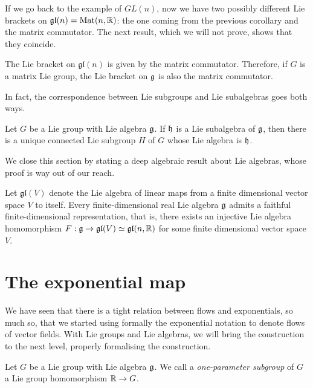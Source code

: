 If we go back to the example of $GL(n)$, now we have two possibly different Lie brackets on $\mathfrak{gl}(n)=\mathrm{Mat}(n, \mathbb{R})$: the one coming from the previous corollary and the matrix commutator.
The next result, which we will not prove, shows that they coincide.

\begin{proposition}
	The Lie bracket on $\mathfrak{gl}(n)$ is given by the matrix commutator.
	Therefore, if $G$ is a matrix Lie group, the Lie bracket on $\mathfrak{g}$ is also the matrix commutator.
\end{proposition}

In fact, the correspondence between Lie subgroups and Lie subalgebras goes both ways.

\begin{theorem}
	Let $G$ be a Lie group with Lie algebra $\mathfrak{g}$. If $\mathfrak{h}$ is a Lie subalgebra of $\mathfrak{g}$, then there is a unique connected Lie subgroup $H$ of $G$ whose Lie algebra is $\mathfrak{h}$.
\end{theorem}

We close this section by stating a deep algebraic result about Lie algebras, whose proof is way out of our reach.
\begin{theorem}
	Let $\mathfrak{gl}(V)$ denote the Lie algebra of linear maps from a finite dimensional vector space $V$ to itself.
	Every finite-dimensional real Lie algebra $\mathfrak{g}$ admits a faithful finite-dimensional representation, that is, there exists an injective Lie algebra homomorphism $F: \mathfrak{g} \to \mathfrak{gl}(V)\simeq\mathfrak{gl}(n,\mathbb{R})$ for some finite dimensional vector space $V$.
\end{theorem}

\section{The exponential map}

We have seen that there is a tight relation between flows and exponentials, so much so, that we started using formally the exponential notation to denote flows of vector fields.
With Lie groups and Lie algebras, we will bring the construction to the next level, properly formalising the construction.

\begin{definition}
	Let $G$ be a Lie group with Lie algebra $\mathfrak{g}$.
	We call a \emph{one-parameter subgroup} of $G$ a Lie group homomorphism $\mathbb{R}\to G$.
\end{definition}

